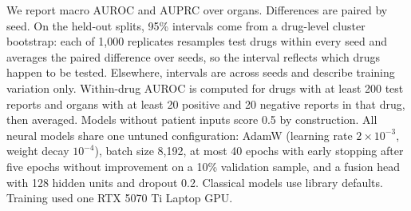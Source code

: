 \documentclass[conference,letterpaper]{IEEEtran}
\begin{document}
We report macro AUROC and AUPRC over organs. Differences are paired by seed. On the held-out splits, 95\% intervals come from a drug-level cluster bootstrap: each of 1,000 replicates resamples test drugs within every seed and averages the paired difference over seeds, so the interval reflects which drugs happen to be tested. Elsewhere, intervals are across seeds and describe training variation only. Within-drug AUROC is computed for drugs with at least 200 test reports and organs with at least 20 positive and 20 negative reports in that drug, then averaged. Models without patient inputs score 0.5 by construction. All neural models share one untuned configuration: AdamW (learning rate $2\times10^{-3}$, weight decay $10^{-4}$), batch size 8,192, at most 40 epochs with early stopping after five epochs without improvement on a 10\% validation sample, and a fusion head with 128 hidden units and dropout 0.2. Classical models use library defaults. Training used one RTX 5070 Ti Laptop GPU.
\end{document}
